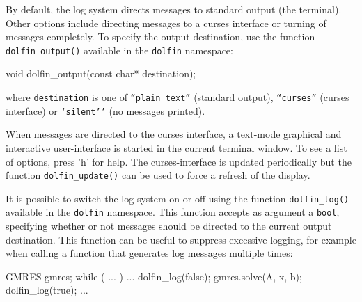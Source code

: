 By default, the \dolfin{} log system directs messages to standard
output (the terminal). Other options include directing messages to a
curses interface or turning of messages completely. To specify the
output destination, use the function \texttt{dolfin\_output()}
available in the \texttt{dolfin} namespace:
\begin{code}
void dolfin_output(const char* destination);
\end{code}
where \texttt{destination} is one of
\texttt{``plain text''} (standard output),
\texttt{``curses''} (curses interface)
or \texttt{`silent''} (no messages printed).

When messages are directed to the \dolfin{} curses interface, a
text-mode graphical and interactive user-interface is started in the
current terminal window. To see a list of options, press 'h' for
help. The curses-interface is updated periodically but the function
\texttt{dolfin\_update()} can be used to force a refresh of the
display.

It is possible to switch the \dolfin{} log system on or off using the
function \texttt{dolfin\_log()} available in the \texttt{dolfin} namespace.
This function accepts as argument a \texttt{bool}, specifying whether
or not messages should be directed to the current output destination.
This function can be useful to suppress excessive logging, for example
when calling a function that generates log messages multiple times:
\begin{code}
GMRES gmres;
while ( ... )
{
  ...
  dolfin_log(false);
  gmres.solve(A, x, b);
  dolfin_log(true);
  ...
}
\end{code}
